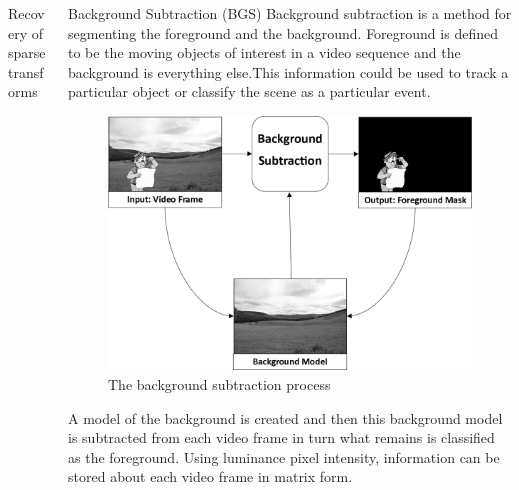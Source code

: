 \documentclass[final]{beamer}
\begin{document}
\begin{frame}{}
\begin{columns}[t]
\begin{column}{0.24\textwidth}
\begin{block}{Recovery of sparse transforms}
      \end{block}

      \vspace{10pt}
      
     
      \end{column}%
 
    \begin{column}{0.24\textwidth}

		\begin{block}{Background Subtraction (BGS)}
Background subtraction is a method for segmenting the foreground and the background. Foreground is defined to be the moving objects of interest in a video sequence and the background is everything else.This information could be used to track a particular object or classify the scene as a particular event.
\vspace{20pt}
 
 \begin{figure}
                    \centering
                   \includegraphics{backgroundsubtraction} 
\caption{The background subtraction process}
                  \end{figure}
\vspace{20pt}
A model of the background is created and then this background model is subtracted from each video frame in turn what remains is classified as the foreground. Using luminance pixel intensity, information can be stored about each video frame in matrix form. 


\end{block}
\end{column}
\end{columns}
\end{frame}
\end{document}
